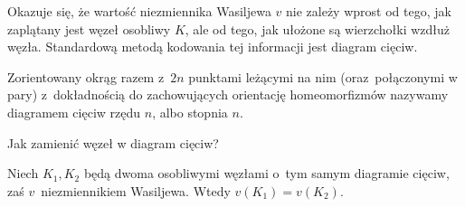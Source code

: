 
Okazuje się, że wartość niezmiennika Wasiljewa $v$ nie zależy wprost od tego, jak zaplątany jest węzeł osobliwy $K$, ale od tego, jak ułożone są wierzchołki wzdłuż węzła. Standardową metodą kodowania tej informacji jest diagram cięciw.

\begin{definition}
%
    Zorientowany okrąg razem z~$2n$ punktami leżącymi na nim (oraz~połączonymi w pary) z~dokładnością do zachowujących orientację homeomorfizmów nazywamy diagramem cięciw rzędu $n$, albo stopnia $n$.
\end{definition}

\begin{tobedone}
    Jak zamienić węzeł w diagram cięciw?
\end{tobedone}

\begin{proposition}
    Niech $K_1, K_2$ będą dwoma osobliwymi węzłami o~tym samym diagramie cięciw, zaś $v$~niezmiennikiem Wasiljewa.
    Wtedy $v(K_1) = v(K_2)$.
\end{proposition}

